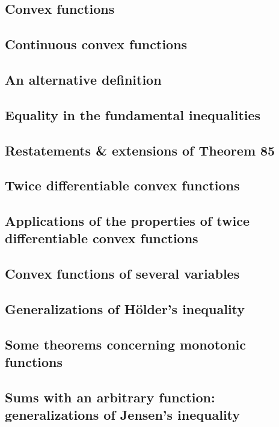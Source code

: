 \documentclass[oneside]{book}
\numberwithin{equation}{section}
\begin{document}
\subsection{Convex functions}

\subsection{Continuous convex functions}

\subsection{An alternative definition}

\subsection{Equality in the fundamental inequalities}

\subsection{Restatements \& extensions of Theorem 85}

\subsection{Twice differentiable convex functions}

\subsection{Applications of the properties of twice differentiable convex functions}

\subsection{Convex functions of several variables}

\subsection{Generalizations of H\"older's inequality}

\subsection{Some theorems concerning monotonic functions}

\subsection{Sums with an arbitrary function: generalizations of Jensen's inequality}
\end{document}
